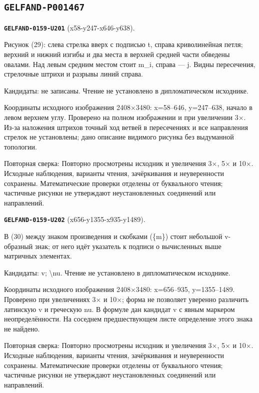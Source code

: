\subsection*{\texttt{GELFAND-P001467}}
\par\noindent\leavevmode{}\label{GELFAND-0159-U201}\label{GELFAND-P001467:x58-y247-x646-y638}\textbf{\texttt{GELFAND-0159-U201}} (x58-y247-x646-y638).\nopagebreak[4]\par
Рисунок (29): слева стрелка вверх с подписью t, справа криволинейная петля; верхний и нижний изгибы и два места в верхней средней части обведены овалами. Над левым средним местом стоит m\_i, справа — j. Видны пересечения, стрелочные штрихи и разрывы линий справа.\par
Кандидаты: не записаны. Чтение не установлено в дипломатическом исходнике.\par
Координаты исходного изображения 2408×3480: x=58–646, y=247–638, начало в левом верхнем углу. Проверено на полном изображении и при увеличении 3×. Из-за наложения штрихов точный ход ветвей в пересечениях и все направления стрелок не установлены; дано описание видимого рисунка без выдуманной топологии.\par
Повторная сверка: Повторно просмотрены исходник и увеличения 3×, 5× и 10×. Исходные наблюдения, варианты чтения, зачёркивания и неуверенности сохранены. Математические проверки отделены от буквального чтения; частичные рисунки не утверждают неустановленных соединений или направлений.\par\medskip
\par\noindent\leavevmode{}\label{GELFAND-0159-U202}\label{GELFAND-P001467:x656-y1355-x935-y1489}\textbf{\texttt{GELFAND-0159-U202}} (x656-y1355-x935-y1489).\nopagebreak[4]\par
В (30) между знаком произведения и скобками (\{m\}) стоит небольшой v-образный знак; от него идёт указатель к подписи о вычисленных выше матричных элементах.\par
Кандидаты: v; \textbackslash{}nu. Чтение не установлено в дипломатическом исходнике.\par
Координаты исходного изображения 2408×3480: x=656–935, y=1355–1489. Проверено при увеличениях 3× и 10×; форма не позволяет уверенно различить латинскую v и греческую nu. В формуле дан кандидат v с явным маркером неопределённости. На соседнем предшествующем листе определение этого знака не найдено.\par
Повторная сверка: Повторно просмотрены исходник и увеличения 3×, 5× и 10×. Исходные наблюдения, варианты чтения, зачёркивания и неуверенности сохранены. Математические проверки отделены от буквального чтения; частичные рисунки не утверждают неустановленных соединений или направлений.\par\medskip
